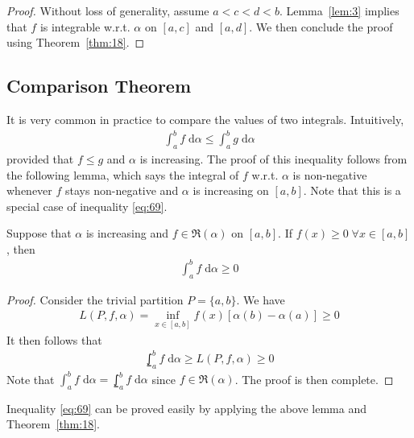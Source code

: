 \documentclass[thmcnt=section, 12pt]{my-elegantbook}
\begin{document}
\begin{proof}
    Without loss of generality, assume $a < c < d < b$. Lemma~\ref{lem:3} implies that $f$ is integrable w.r.t. $\alpha$ on $[a, c]$ and $[a, d]$. We then conclude the proof using Theorem~\ref{thm:18}.
\end{proof}


\subsection{Comparison Theorem}

It is very common in practice to compare the values of two integrals. Intuitively,
\begin{align}
    \int_{a}^{b} f \; \mathrm{d}\alpha
    \leq \int_{a}^{b} g \; \mathrm{d}\alpha
    \label{eq:69}
\end{align}
provided that $f \leq g$ and $\alpha$ is increasing. The proof of this inequality follows from the following lemma, which says the integral of $f$ w.r.t. $\alpha$ is non-negative whenever $f$ stays non-negative and $\alpha$ is increasing on $[a, b]$. Note that this is a special case of inequality \eqref{eq:69}.

\begin{lemma} \label{lem:1}
    Suppose that $\alpha$ is increasing and $f \in \mathfrak{R}(\alpha)$ on $[a, b]$. If $f(x) \geq 0 \; \forall x \in [a, b]$, then 
    \begin{align*}
        \int_{a}^{b} f \; \mathrm{d}\alpha \geq 0
    \end{align*}
\end{lemma}

\begin{proof}
    Consider the trivial partition $P = \{a, b\}$. We have
    \begin{align*}
        L(P,f,\alpha) = \inf_{x \in [a, b]} f(x) [\alpha(b) - \alpha(a)]
        \geq 0
    \end{align*}
    It then follows that 
    \begin{align*}
        \lowint_a^b f \; \mathrm{d}\alpha
        \geq L(P,f,\alpha)
        \geq 0
    \end{align*}
    Note that $\int_{a}^{b} f \; \mathrm{d}\alpha = \lowint_a^b f \; \mathrm{d}\alpha$ since $f \in \mathfrak{R}(\alpha)$. The proof is then complete.
\end{proof}

Inequality \eqref{eq:69} can be proved easily by applying the above lemma and Theorem~\ref{thm:18}.
\end{document}

